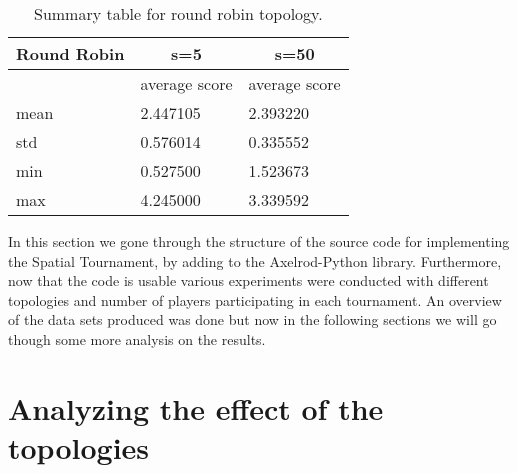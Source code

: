 \begin{table}[H]
\centering
\begin{tabular}{|l|l|l|}
\hline
Round Robin & \multicolumn{1}{c|}{s=5} & \multicolumn{1}{c|}{s=50} \\ \hline
            & average score            & average score             \\ \hline
mean        & 2.447105                 & 2.393220                  \\ \hline
std         & 0.576014                 & 0.335552                  \\ \hline
min         & 0.527500                 & 1.523673                  \\ \hline
max         & 4.245000                 & 3.339592                  \\ \hline
\end{tabular}
\caption{Summary table for round robin topology.}
\label{sum-rr}
\end{table}

In this section we gone through the structure of the source code for implementing
the Spatial Tournament, by adding to the Axelrod-Python library. Furthermore, now
that the code is usable various experiments were conducted with different topologies
and number of players participating in each tournament. An overview of the
data sets produced was done but now in the following sections we will go though
some more analysis on the results.

\newpage
\section{Analyzing the effect of the topologies}
\label{sub:effects}

